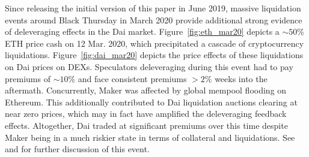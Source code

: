 Since releasing the initial version of this paper in June 2019, massive liquidation events around Black Thursday in March 2020 provide additional strong evidence of deleveraging effects in the Dai market. Figure~\ref{fig:eth_mar20} depicts a $\sim 50\%$ ETH price cash on 12 Mar. 2020, which precipitated a cascade of cryptocurrency liquidations. Figure~\ref{fig:dai_mar20} depicts the price effects of these liquidations on Dai prices on DEXs. Speculators deleveraging during this event had to pay premiums of $\sim 10\%$ and face consistent premiums $>2\%$ weeks into the aftermath. 
Concurrently, Maker was affected by global mempool flooding on Ethereum. This additionally contributed to Dai liquidation auctions clearing at near zero prices, which may in fact have amplified the deleveraging feedback effects. Altogether, Dai traded at significant premiums over this time despite Maker being in a much riskier state in terms of collateral and liquidations.
See \cite{klagesmundt2020insights} and \cite{blocknative2020} for further discussion of this event.

